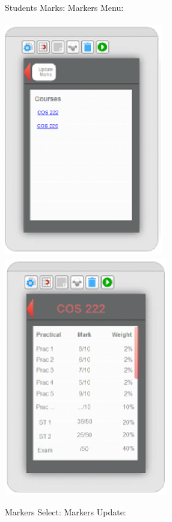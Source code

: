 \documentclass{article}
\begin{document}
  Students Marks:              Markers Menu:

\noindent \includegraphics*[width=2.74in, height=4.04in, keepaspectratio=false]{image15}     \includegraphics*[width=2.81in, height=4.07in, keepaspectratio=false]{image16}

  Markers Select:     Markers Update:
\end{document}
